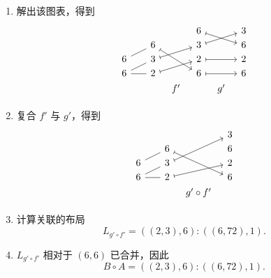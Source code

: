 \begin{example}
\begin{enumerate}
        \item 解出该图表，得到
        \[ \begin{tikzcd} [row sep = 1, column sep = 8]
              & &        & &  6 \ar[drr,mapsto] & & 3 \\
        & &  6 \ar[ddrr,mapsto] & &  3 \ar[urr, mapsto] & & 6 \\
       6 \ar[rru,-] & & 3 \ar[urr,mapsto] & &   2 \ar[rr,mapsto] & & 2 \\
       6 \ar[rr,-] \ar[urr,-] & &  2 \ar[urr,mapsto] & &  6 \ar[rr,mapsto] & & 6 \\
        & & & f' &  & g' &  \\
        \end{tikzcd} \]
        \item 复合 $f'$ 与 $g'$，得到
        \[ \begin{tikzcd} [row sep = 1, column sep = 8]
         & &  & & 3\\
         & & 6 \ar[ddrr,mapsto] & & 6\\
        6 \ar[urr,-] & & 3 \ar[uurr,mapsto] & & 2\\
        6 \ar[rr,-] \ar[urr,-] & & 2 \ar[urr,mapsto] & & 6\\
        & & & g' \circ f'& \\
        \end{tikzcd} \]
        \item 计算关联的布局
        \[
        L_{g' \circ f'} = ((2,3),6):((6,72),1).
        \]
        \item $L_{g' \circ f'}$ 相对于 $(6,6)$ 已合并，因此
        \[
        B \circ A = ((2,3),6):((6,72),1).
        \]
    \end{enumerate}
\end{example}


